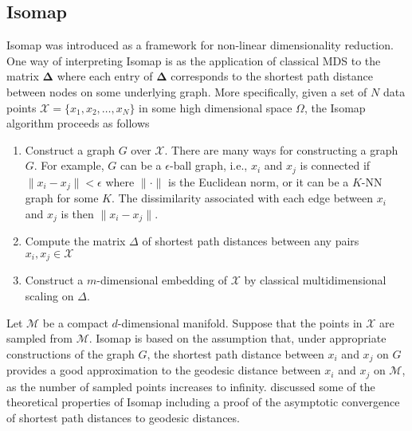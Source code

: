 \subsection{Isomap}
\label{sec:isomap}
Isomap \citep{tenebaum00:_global_geomet_framew_nonlin_dimen_reduc} was
introduced as a framework for non-linear dimensionality reduction. One
way of interpreting Isomap is as the application of classical MDS to
the matrix $\bm{\Delta}$ where each entry of $\bm{\Delta}$ corresponds
to the shortest path distance between nodes on some underlying
graph. More specifically, given a set of $N$ data points $\mathcal{X}
= \{x_1, x_2, \dots, x_N\}$ in some high dimensional space $\Omega$,
the Isomap algorithm proceeds as follows
\begin{enumerate}
\item Construct a graph $G$ over $\mathcal{X}$. There are many ways
  for constructing a graph $G$. For example, $G$ can be a
  $\epsilon$-ball graph, i.e., $x_i$ and $x_j$ is connected if $\|x_i
  - x_j\| < \epsilon$ where $\| \cdot \|$ is the Euclidean norm, or it
  can be a $K$-NN graph for some $K$. The dissimilarity associated
  with each edge between $x_i$ and $x_j$ is then $\|x_i - x_j \|$.
\item Compute the matrix $\Delta$ of shortest path distances between
  any pairs $x_i, x_j \in \mathcal{X}$
\item Construct a $m$-dimensional embedding of $\mathcal{X}$ by
  classical multidimensional scaling on $\Delta$.  
\end{enumerate}
Let $\mathcal{M}$ be a compact $d$-dimensional manifold. Suppose that
the points in $\mathcal{X}$ are sampled from $\mathcal{M}$. Isomap is
based on the assumption that, under appropriate constructions of the
graph $G$, the shortest path distance between $x_i$ and $x_j$ on $G$
provides a good approximation to the geodesic distance between $x_i$
and $x_j$ on $\mathcal{M}$, as the number of sampled points increases to
infinity. \citet{bernstein00:_graph} discussed some of the theoretical
properties of Isomap including a proof of the asymptotic convergence
of shortest path distances to geodesic distances.
